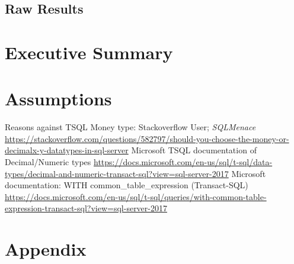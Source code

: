 \documentclass{article}
\newcounter{num}
\begin{document}
        \subsection{Raw Results}

    \newpage
    \section{Executive Summary}

    \newpage
    \section{Assumptions}

    \newpage
    \begin{thebibliography}{9}
        \raggedright
            Reasons against TSQL Money type: Stackoverflow User; \textit{SQLMenace}
            \url{https://stackoverflow.com/questions/582797/should-you-choose-the-money-or-decimalx-y-datatypes-in-sql-server}
            Microsoft TSQL documentation of Decimal/Numeric types
            \url{https://docs.microsoft.com/en-us/sql/t-sql/data-types/decimal-and-numeric-transact-sql?view=sql-server-2017}
        Microsoft documentation: WITH common\_table\_expression (Transact-SQL)
            \url{https://docs.microsoft.com/en-us/sql/t-sql/queries/with-common-table-expression-transact-sql?view=sql-server-2017}
    \end{thebibliography}

    \newpage
    \section{Appendix}
    \label{sec:Appendix}
\end{document}
